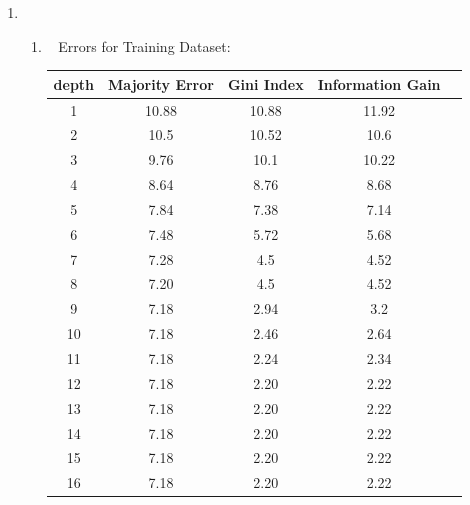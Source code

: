 \documentclass[12pt, fullpage,letterpaper]{article}
\begin{document}
\begin{enumerate}
\item~
\begin{enumerate}
	\item~
	\newline
\newline
\newline
\newline
\newline
\newline
\newline
\newline
\newline
\newline
\newline
\newline
\newline
\newline
\newline
\newline
\newline
\newline
	\newline Errors for Training Dataset:
	\begin{table}[h]
	\centering
	\begin{tabular}{cccc|c}
		depth & Majority Error & Gini Index & Information Gain\\ 
		\hline\hline
		1 & 10.88 & 10.88 & 11.92 \\ \hline
		2 & 10.5 & 10.52 & 10.6 \\ \hline
		3 & 9.76 & 10.1 & 10.22 \\ \hline
		4 & 8.64 & 8.76 & 8.68 \\ \hline
		5 & 7.84 & 7.38 & 7.14\\ \hline
		6 & 7.48 & 5.72 & 5.68\\ \hline
		7 & 7.28 & 4.5 & 4.52 \\ \hline
		8 & 7.20 & 4.5 & 4.52 \\ \hline
		9 & 7.18 & 2.94 & 3.2 \\ \hline
		10 & 7.18 & 2.46 & 2.64 \\ \hline
		11 & 7.18 & 2.24 & 2.34\\ \hline
		12 & 7.18 & 2.20 & 2.22\\ \hline
		13 & 7.18 & 2.20 & 2.22\\ \hline
		14 & 7.18 & 2.20 & 2.22\\ \hline
		15 & 7.18 & 2.20 & 2.22\\ \hline
		16 & 7.18 & 2.20 & 2.22\\ \hline
	\end{tabular}
\end{table}


\end{enumerate}
\end{enumerate}
\end{document}
